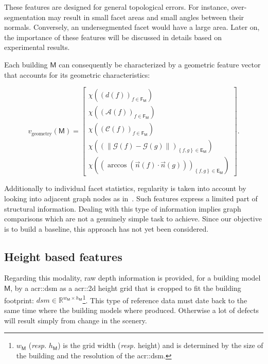         These features are designed for general topological errors.
        For instance, over-segmentation may result in small facet areas and small angles between their normals.
        Conversely, an undersegmented facet would have a large area.
        Later on, the importance of these features will be discussed in details based on experimental results.
        
        Each building $\mathsf{M}$ can consequently be characterized by a geometric feature vector that accounts for its geometric characteristics:

        \begin{equation}
        	\label{eq::geometric_features}
            v_{\text{geometry}}(\mathsf{M}) = \begin{bmatrix}
            	\chi \left(\left(d\left(f\right)\right)_{f \in \mathsf{F_M}}\right)\\
                \chi \left(\left(\mathscr{A}\left(f\right)\right)_{f \in \mathsf{F_M}}\right)\\
                \chi \left(\left(\mathscr{C}\left(f\right)\right)_{f \in \mathsf{F_M}}\right)\\
                \chi \left(\left( \left\lVert \mathscr{G}\left(f\right) - \mathscr{G}\left(g\right) \right\rVert \right)_{\left\{f, g\right\} \in \mathsf{E_M}}\right)\\
                \chi \left(\left( \arccos\left(\vec{n}\left(f\right) \cdot \vec{n}\left(g\right)\right) \right)_{\left\{f, g\right\} \in \mathsf{E_M}}\right)
            \end{bmatrix}.
        \end{equation}

        Additionally to individual facet statistics, regularity is taken into account by looking into adjacent graph nodes as in~\parencite{zhou20102}.
        Such features express a limited  part of structural information.
        Dealing with this type of information implies graph comparisons which are not a genuinely simple task to achieve.
        Since our objective is to build a baseline, this approach has not yet been considered.

    \subsection{Height based features}
        \label{subsec::learned_evaluation::baseline::height}
        Regarding this modality, raw depth information is provided, for a building model \(\mathsf{M}\), by a \gls{acr::dsm} as a \gls{acr::2d} height grid that is cropped to fit the building footprint: $dsm \in \mathbb{R}^{w_{\mathsf{M}} \times h_{\mathsf{M}}}$\footnote{\label{note::w_h}\(w_{\mathsf{M}}\) (\textit{resp.} \(h_{\mathsf{M}}\)) is the grid width (\textit{resp.} height) and is determined by the size of the building and the resolution of the \gls{acr::dsm}.}.
        This type of reference data must date back to the same time where the building models where produced.
        Otherwise a lot of defects will result simply from change in the scenery.\\
        

